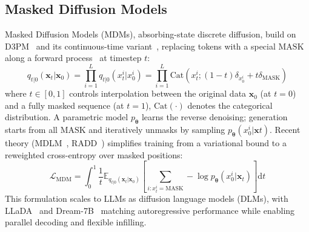 \documentclass{article} %
\theoremstyle{definition}
\theoremstyle{remark}
\begin{document}
\subsection{Masked Diffusion Models}

Masked Diffusion Models (MDMs), absorbing-state discrete diffusion, build on D3PM~\citep{austin2021structured} and its continuous-time variant~\citep{campbell2022continuous}, replacing tokens with a special $\text{MASK}$ along a forward process~\citep{sahoo2024simple,shi2024simplified} at timestep $t$:
\begin{equation}\label{eq:forward_mask}
q_{t|0}(\boldsymbol{x}_t | \boldsymbol{x}_0) = \prod_{i=1}^L q_{t|0}(x_t^i | x_0^i) = \prod_{i=1}^L \text{Cat}(x_t^i; (1-t)\delta_{x_0^i} + t \delta_{\text{MASK}})
\end{equation}
where $t \in [0, 1]$ controls interpolation between the original data $\boldsymbol{x}_0$ (at $t=0$) and a fully masked sequence (at $t=1$), $\text{Cat}(\cdot)$ denotes the categorical distribution. 
A parametric model $p_{\boldsymbol{\theta}}$ learns the reverse denoising; generation starts from all $\text{MASK}$ and iteratively unmasks by sampling $p_{\boldsymbol{\theta}}(x_0^i|\boldsymbol{x}t)$. Recent theory (MDLM~\citep{shi2024simplified,sahoo2024simple}, RADD~\citep{ou2024your}) simplifies training from a variational bound to a reweighted cross-entropy over masked positions:
\begin{equation}
\mathcal{L}_{\text{MDM}} = \int_{0}^1 \frac{1}{t} \mathbb{E}_{q_{t|0}(\boldsymbol{x}_t | \boldsymbol{x}_0)} \left[ \sum_{i: x_t^i = \text{MASK}} -\log p_{\boldsymbol{\theta}}(x_0^i | \boldsymbol{x}_t) \right] \mathrm{d}t
\end{equation}
This formulation scales to LLMs as diffusion language models (DLMs), with LLaDA~\citep{nie2025largelanguagediffusionmodels} and Dream-7B~\citep{dream2025} matching autoregressive performance while enabling parallel decoding and flexible infilling.

\vspace{-0.1in}
\end{document}
